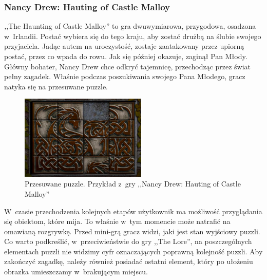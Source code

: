 \documentclass[oneside,polski,logo]{amuthesis}
\begin{document}
\subsubsection{Nancy Drew: Hauting of Castle Malloy}
\par \emph ,,The Haunting of Castle Malloy'' to gra dwuwymiarowa, przygodowa, osadzona w~Irlandii. Postać wybiera się do tego kraju, aby zostać drużbą na ślubie swojego przyjaciela. Jadąc autem na uroczystość, zostaje zaatakowany przez upiorną postać, przez co wpada do rowu. Jak się później okazuje, zaginął Pan Młody. Główny bohater, Nancy Drew chce odkryć tajemnicę, przechodząc przez świat pełny zagadek. Właśnie podczas poszukiwania swojego Pana Młodego, gracz natyka się na przesuwane puzzle. 
\begin{figure}[h]
	\centering
	\includegraphics[width=6cm]{images/tyrek/nd.png}
	\caption{Przesuwane puzzle. Przykład z~gry ,,Nancy Drew: Hauting of Castle Malloy''}
\end{figure}

W~czasie przechodzenia kolejnych etapów użytkownik ma możliwość przyglądania się obiektom, które mija. To właśnie w~tym momencie może natrafić na omawianą rozgrywkę. Przed mini-grą gracz widzi, jaki jest stan wyjściowy puzzli. Co warto podkreślić, w~przeciwieństwie do gry ,,The Lore'', na poszczególnych elementach puzzli nie widzimy cyfr oznaczających poprawną kolejność puzzli. Aby zakończyć zagadkę, należy również posiadać ostatni element, który po ułożeniu obrazka umieszczamy w~brakującym miejscu. \cite{nd}
\end{document}
